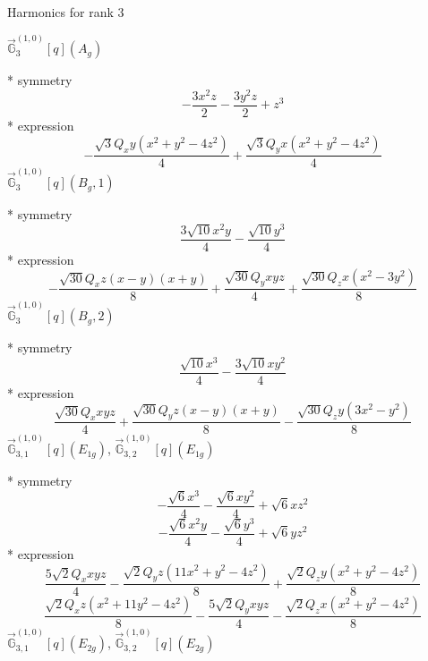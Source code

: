 \documentclass[fleqn,8pt]{jsarticle}
\begin{document}
\noindent * Harmonics for rank 3

\noindent\quad $\vec{\mathbb{G}}_{3}^{(1,0)}[q](A_{g})$

\noindent\quad ** symmetry
\begin{dmath*}
- \frac{3 x^{2} z}{2} - \frac{3 y^{2} z}{2} + z^{3}
\end{dmath*}
\noindent\quad ** expression
\begin{dmath*}
- \frac{\sqrt{3} Q_{x} y \left(x^{2} + y^{2} - 4 z^{2}\right)}{4} + \frac{\sqrt{3} Q_{y} x \left(x^{2} + y^{2} - 4 z^{2}\right)}{4}
\end{dmath*}
\noindent\quad $\vec{\mathbb{G}}_{3}^{(1,0)}[q](B_{g},1)$

\noindent\quad ** symmetry
\begin{dmath*}
\frac{3 \sqrt{10} x^{2} y}{4} - \frac{\sqrt{10} y^{3}}{4}
\end{dmath*}
\noindent\quad ** expression
\begin{dmath*}
- \frac{\sqrt{30} Q_{x} z \left(x - y\right) \left(x + y\right)}{8} + \frac{\sqrt{30} Q_{y} x y z}{4} + \frac{\sqrt{30} Q_{z} x \left(x^{2} - 3 y^{2}\right)}{8}
\end{dmath*}
\noindent\quad $\vec{\mathbb{G}}_{3}^{(1,0)}[q](B_{g},2)$

\noindent\quad ** symmetry
\begin{dmath*}
\frac{\sqrt{10} x^{3}}{4} - \frac{3 \sqrt{10} x y^{2}}{4}
\end{dmath*}
\noindent\quad ** expression
\begin{dmath*}
\frac{\sqrt{30} Q_{x} x y z}{4} + \frac{\sqrt{30} Q_{y} z \left(x - y\right) \left(x + y\right)}{8} - \frac{\sqrt{30} Q_{z} y \left(3 x^{2} - y^{2}\right)}{8}
\end{dmath*}
\noindent\quad $\vec{\mathbb{G}}_{3,1}^{(1,0)}[q](E_{1g})$, $\vec{\mathbb{G}}_{3,2}^{(1,0)}[q](E_{1g})$

\noindent\quad ** symmetry
\begin{dmath*}
- \frac{\sqrt{6} x^{3}}{4} - \frac{\sqrt{6} x y^{2}}{4} + \sqrt{6} x z^{2}
\end{dmath*}
\begin{dmath*}
- \frac{\sqrt{6} x^{2} y}{4} - \frac{\sqrt{6} y^{3}}{4} + \sqrt{6} y z^{2}
\end{dmath*}
\noindent\quad ** expression
\begin{dmath*}
\frac{5 \sqrt{2} Q_{x} x y z}{4} - \frac{\sqrt{2} Q_{y} z \left(11 x^{2} + y^{2} - 4 z^{2}\right)}{8} + \frac{\sqrt{2} Q_{z} y \left(x^{2} + y^{2} - 4 z^{2}\right)}{8}
\end{dmath*}
\begin{dmath*}
\frac{\sqrt{2} Q_{x} z \left(x^{2} + 11 y^{2} - 4 z^{2}\right)}{8} - \frac{5 \sqrt{2} Q_{y} x y z}{4} - \frac{\sqrt{2} Q_{z} x \left(x^{2} + y^{2} - 4 z^{2}\right)}{8}
\end{dmath*}
\noindent\quad $\vec{\mathbb{G}}_{3,1}^{(1,0)}[q](E_{2g})$, $\vec{\mathbb{G}}_{3,2}^{(1,0)}[q](E_{2g})$
\end{document}
